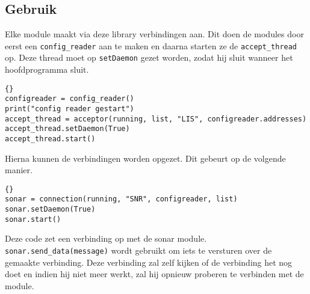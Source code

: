\documentclass[a4paper,10pt]{article}
\begin{document}
\subsection*{Gebruik}
Elke module maakt via deze library verbindingen aan. Dit doen de modules door eerst een \verb!config_reader! aan te maken en daarna starten ze de \verb!accept_thread! op. Deze thread moet op \verb!setDaemon! gezet worden, zodat hij sluit wanneer het hoofdprogramma sluit.
\begin{verbatim}{}
configreader = config_reader()
print("config reader gestart")
accept_thread = acceptor(running, list, "LIS", configreader.addresses)
accept_thread.setDaemon(True)
accept_thread.start()
\end{verbatim}
Hierna kunnen de verbindingen worden opgezet. Dit gebeurt op de volgende manier.
\begin{verbatim}{}
sonar = connection(running, "SNR", configreader, list)
sonar.setDaemon(True)
sonar.start()
\end{verbatim}
Deze code zet een verbinding op met de sonar module. \verb!sonar.send_data(message)! wordt gebruikt om iets te versturen over de gemaakte verbinding. Deze verbinding zal zelf kijken of de verbinding het nog doet en indien hij niet meer werkt, zal hij opnieuw proberen te verbinden met de module.
\end{document}

